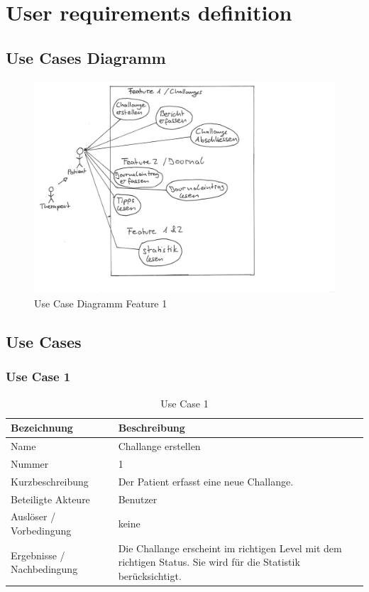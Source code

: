 \chapter{User requirements definition}

\section{Use Cases Diagramm}
\begin{figure}[H]
\includegraphics[width=1\textwidth]{UseCaseDiagramm.jpg}
\caption{Use Case Diagramm Feature 1}
\end{figure}

\section{Use Cases}

\subsection{Use Case 1}
\begin{table}[H]
 \caption{Use Case 1}
 \begin{tabularx}{\textwidth}{|l|X|}
     \hline
     \textbf{Bezeichnung}       & \textbf{Beschreibung} \\
     \hline
     Name                       & Challange erstellen \\
     \hline
     Nummer                     & 1 \\
     \hline
     Kurzbeschreibung           & Der Patient erfasst eine neue Challange. \\
     \hline
     Beteiligte Akteure         & Benutzer \\
     \hline
     Ausl\"{o}ser / Vorbedingung    & keine \\
     \hline
     Ergebnisse / Nachbedingung & Die Challange erscheint im richtigen Level mit dem richtigen Status. Sie wird f\"{u}r die Statistik ber\"{u}cksichtigt. \\
     \hline
 \end{tabularx}
 \label{table: Use Case 1}
\end{table}

